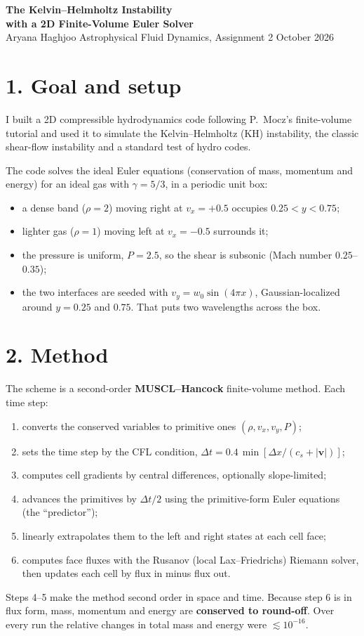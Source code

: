 \documentclass[11pt]{article}
\begin{document}
\begin{center}
{\Large\bfseries The Kelvin--Helmholtz Instability\\[2pt] with a 2D Finite-Volume Euler Solver}\\[6pt]
{\small Aryana Haghjoo \;\textperiodcentered\; Astrophysical Fluid Dynamics, Assignment 2 \;\textperiodcentered\; October 2026}
\end{center}

\section{1. Goal and setup}
I built a 2D compressible hydrodynamics code following P.~Mocz's finite-volume tutorial and used it to simulate the Kelvin--Helmholtz (KH) instability, the classic shear-flow instability and a standard test of hydro codes.

The code solves the ideal Euler equations (conservation of mass, momentum and energy) for an ideal gas with $\gamma=5/3$, in a periodic unit box:
\begin{itemize}[nosep,leftmargin=*]
\item a dense band ($\rho=2$) moving right at $v_x=+0.5$ occupies $0.25<y<0.75$;
\item lighter gas ($\rho=1$) moving left at $v_x=-0.5$ surrounds it;
\item the pressure is uniform, $P=2.5$, so the shear is subsonic (Mach number $0.25$--$0.35$);
\item the two interfaces are seeded with $v_y=w_0\sin(4\pi x)$, Gaussian-localized around $y=0.25$ and $0.75$. That puts two wavelengths across the box.
\end{itemize}

\section{2. Method}
The scheme is a second-order \textbf{MUSCL--Hancock} finite-volume method. Each time step:
\begin{enumerate}[nosep,leftmargin=*]
\item converts the conserved variables to primitive ones $(\rho, v_x, v_y, P)$;
\item sets the time step by the CFL condition, $\Delta t = 0.4\,\min\!\left[\Delta x/(c_s+|\mathbf v|)\right]$;
\item computes cell gradients by central differences, optionally slope-limited;
\item advances the primitives by $\Delta t/2$ using the primitive-form Euler equations (the ``predictor'');
\item linearly extrapolates them to the left and right states at each cell face;
\item computes face fluxes with the Rusanov (local Lax--Friedrichs) Riemann solver, then updates each cell by flux in minus flux out.
\end{enumerate}
Steps 4--5 make the method second order in space and time. Because step 6 is in flux form, mass, momentum and energy are \textbf{conserved to round-off}. Over every run the relative changes in total mass and energy were $\lesssim10^{-16}$.
\end{document}
